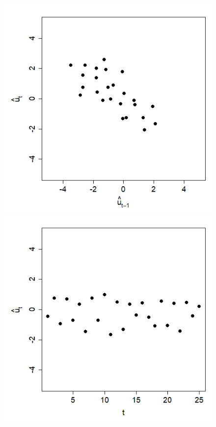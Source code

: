 \documentclass[captions=tableheading, 12pt, headings=small, parskip=half]{scrartcl}
\begin{document}
\begin{figure}[H]
	\begin{minipage}{0.48\columnwidth}
		\includegraphics[width = \columnwidth]{Code2/autoco3.png}
	\end{minipage}
	\hfill
	\begin{minipage}{0.48\columnwidth}
		\includegraphics[width = \columnwidth]{Code2/autoco4.png}
	\end{minipage}
\end{figure}
\end{document}
